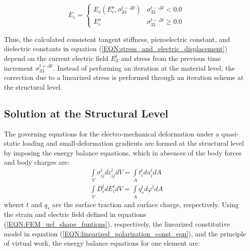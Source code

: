 \begin{equation}
    E_c=\begin{cases}
               E_c \left( E_c^o , \sigma _{33}^{t - \Delta t} \right)  & \sigma _{33}^{t - \Delta t} < 0.0 \\
               E_c^o                                                 & \sigma _{33}^{t - \Delta t} \ge 0.0 
\end{cases}
\label{EQN:coercive_field}
\end{equation}

Thus, the calculated consistent tangent stiffness, piezoelectric constant, and dielectric constants in equation (\ref{EQN:stress_and_electric_displacement}) depend on the current electric field $E^t_3$ and stress from the previous time increment $\sigma^{t+\Delta t}_{33}$. 
Instead of performing an iteration at the material level, the correction due to a linearized stress is performed through an iteration scheme at the structural level.

\subsection{Solution at the Structural Level}
The governing equations for the electro-mechanical deformation under a quasi-static loading and small-deformation gradients are formed at the structural level by imposing the energy balance equations, which in absences of the body forces and body charges are:
\begin{equation}  
\begin{array}{l}
\int\limits_V {\sigma _{ij}^td\varepsilon _{ij}^tdV}  = \int\limits_A {t_i^tdu_i^tdA} \\
\int\limits_V {D_i^tdE_i^tdV}  = \int\limits_A {q_s^td\varphi _{}^tdA} 
\end{array}
\label{EQN:integration}
\end{equation}
wheret $t$ and $q_s$ are the surface traction and surface charge, respectively. 
Using the strain and electric field defined in equations (\ref{EQN:FEM_uel_shape_funtions}), respectively, the linearized constitutive model in equation (\ref{EQN:linearized_polarization_const_eqn}),
 and the principle of virtual work, the energy balance equations for one element are:

